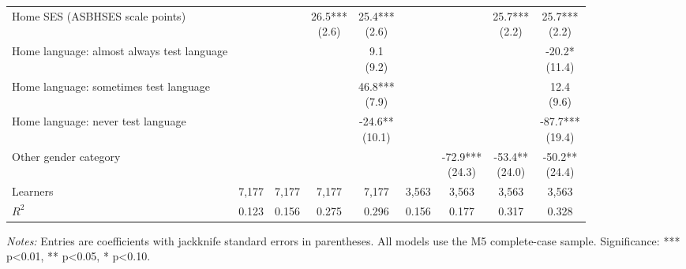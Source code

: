 \begin{table}[!htbp]
{\begin{tabular}{lcccccccc}
Home SES (ASBHSES scale points) &  &  & \shortstack{26.5***\\(2.6)} & \shortstack{25.4***\\(2.6)} &  &  & \shortstack{25.7***\\(2.2)} & \shortstack{25.7***\\(2.2)} \\
Home language: almost always test language &  &  &  & \shortstack{9.1\\(9.2)} &  &  &  & \shortstack{-20.2*\\(11.4)} \\
Home language: sometimes test language &  &  &  & \shortstack{46.8***\\(7.9)} &  &  &  & \shortstack{12.4\\(9.6)} \\
Home language: never test language &  &  &  & \shortstack{-24.6**\\(10.1)} &  &  &  & \shortstack{-87.7***\\(19.4)} \\
Other gender category &  &  &  &  &  & \shortstack{-72.9***\\(24.3)} & \shortstack{-53.4**\\(24.0)} & \shortstack{-50.2**\\(24.4)} \\
\midrule
Learners & 7,177 & 7,177 & 7,177 & 7,177 & 3,563 & 3,563 & 3,563 & 3,563 \\
$R^{2}$ & 0.123 & 0.156 & 0.275 & 0.296 & 0.156 & 0.177 & 0.317 & 0.328 \\
\bottomrule
\end{tabular}%
}
\parbox{0.98\textwidth}{\footnotesize \textit{Notes:} Entries are coefficients with jackknife standard errors in parentheses. All models use the M5 complete-case sample. Significance: *** p\textless{}0.01, ** p\textless{}0.05, * p\textless{}0.10.}
\end{table}
